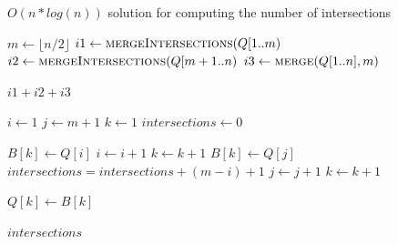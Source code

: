 \begin{algorithm} [H]
	\caption{$O(n * log(n))$ solution for computing the number of intersections}
	\begin{algorithmic}
	
	  	\State {} 
		
		\Return {} 
	  \EndFunction
	  
	  \EndFunction
	  
		
		\EndIf
	  
	  	\State $m \gets \lfloor n/2 \rfloor$
		\State $i1 \gets \Call{mergeIntersections}{Q[1 .. m}$	
		\State $i2 \gets \Call{mergeIntersections}{Q[m + 1 .. n}$
		\State $i3 \gets \Call{merge}{Q[1 .. n], m}$ 
	 
	 	\Return $i1 + i2 + i3$
	  \EndFunction
	  
	  	\State $i \gets 1$
	  	\State $j \gets m + 1$
		\State $k \gets 1$
	  	\State $intersections \gets 0$
		
				\State $B[k] \gets Q[i]$
				\State $i \gets i + 1$ 
				\State $k \gets k + 1$
			\Else
				\State $B[k] \gets Q[j]$
				\State $intersections = intersections + (m - i) + 1$
				\State $j \gets j + 1$ 
				\State $k \gets k + 1$
			\EndIf
		
				\State $Q[k] \gets B[k]$
			\EndFor
			
			\Return $intersections$
		\EndWhile
	  
	  \EndFunction
	  \end{algorithmic}
	  
	  
\end{algorithm}
